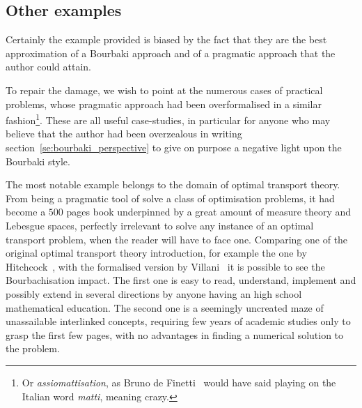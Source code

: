 \documentclass[]{scrartcl}
\theoremstyle{definition}
\begin{document}

\subsection*{Other examples}

Certainly the example provided is biased by the fact that they are the best approximation of a Bourbaki approach and of a pragmatic approach that the author could attain.

To repair the damage, we wish to point at the numerous cases of practical problems, whose pragmatic approach had been overformalised in a similar fashion\footnote{
    Or \emph{assiomattisation}, as Bruno de Finetti~\cite{de2008bruno} would have said playing on the Italian word \emph{matti}, meaning crazy.
}. These are all useful case-studies, in particular for anyone who may believe that the author had been overzealous in writing section~\ref{se:bourbaki_perspective} to give on purpose a negative light upon the Bourbaki style.

The most notable example belongs to the domain of optimal transport theory. From being a pragmatic tool of solve a class of optimisation problems, it had become a $500$ pages book underpinned by a great amount of measure theory and Lebesgue spaces, perfectly irrelevant to solve any instance of an optimal transport problem, when the reader will have to face one. Comparing one of the original optimal transport theory introduction, for example the one by Hitchcock~\cite{hitchcock1941distribution}, with the formalised version by Villani~\cite{villani2003topics} it is possible to see the Bourbachisation impact. The first one is easy to read, understand, implement and possibly extend in several directions by anyone having an high school mathematical education. The second one is a seemingly uncreated maze of unassailable interlinked concepts, requiring few years of academic studies only to grasp the first few pages, with no advantages in finding a numerical solution to the problem. %
\end{document}
